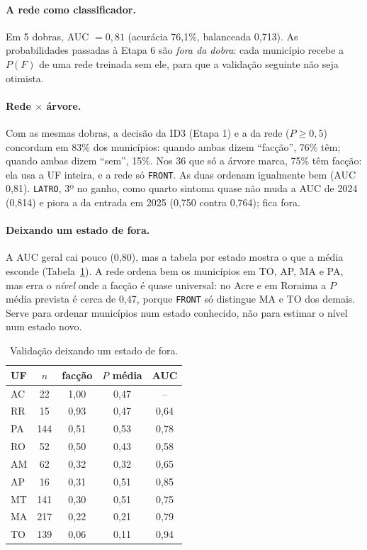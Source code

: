 \documentclass[10pt,a4paper,twocolumn]{article}
\begin{document}
\paragraph{A rede como classificador.} Em 5 dobras, AUC $=0{,}81$ (acurácia 76,1\%,
balanceada 0,713). As probabilidades passadas à Etapa 6 são \emph{fora da dobra}: cada
município recebe a $P(F)$ de uma rede treinada sem ele, para que a validação seguinte não
seja otimista.

\paragraph{Rede $\times$ árvore.} Com as mesmas dobras, a decisão da ID3 (Etapa 1) e a da rede
($P\ge0{,}5$) concordam em 83\% dos municípios: quando ambas dizem ``facção'', 76\% têm;
quando ambas dizem ``sem'', 15\%. Nos 36 que só a árvore marca, 75\% têm facção: ela usa a
UF inteira, e a rede só \texttt{FRONT}. As duas ordenam igualmente bem (AUC 0,81).
\texttt{LATRO}, 3º no ganho, como quarto sintoma quase não muda a AUC de 2024 (0,814) e piora
a da entrada em 2025 (0,750 contra 0,764); fica fora.

\paragraph{Deixando um estado de fora.} A AUC geral cai pouco (0,80), mas a tabela por
estado mostra o que a média esconde (Tabela~\ref{tab:uf}). A rede ordena bem os municípios
em TO, AP, MA e PA, mas erra o \emph{nível} onde a facção é quase universal: no Acre e em
Roraima a $P$ média prevista é cerca de 0,47, porque \texttt{FRONT} só distingue MA e TO dos
demais. Serve para ordenar municípios num estado conhecido, não para estimar o nível num
estado novo.

\begin{table}[t]
\centering\small
\begin{tabular}{@{}lcccc@{}}
\toprule
UF & $n$ & facção & $P$ média & AUC\\
\midrule
AC & 22 & 1,00 & 0,47 & --\\
RR & 15 & 0,93 & 0,47 & 0,64\\
PA & 144 & 0,51 & 0,53 & 0,78\\
RO & 52 & 0,50 & 0,43 & 0,58\\
AM & 62 & 0,32 & 0,32 & 0,65\\
AP & 16 & 0,31 & 0,51 & 0,85\\
MT & 141 & 0,30 & 0,51 & 0,75\\
MA & 217 & 0,22 & 0,21 & 0,79\\
TO & 139 & 0,06 & 0,11 & 0,94\\
\bottomrule
\end{tabular}
\caption{Validação deixando um estado de fora.}\label{tab:uf}
\end{table}
\end{document}

